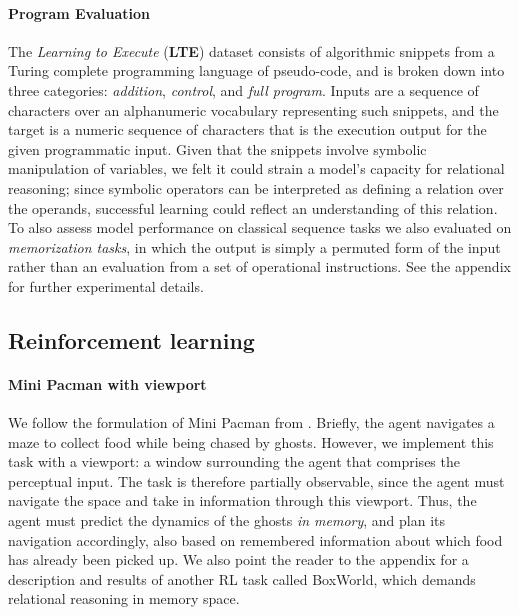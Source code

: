\documentclass{article}
\begin{document}
\paragraph{Program Evaluation}
The \textit{Learning to Execute} (\textbf{LTE}) dataset \cite{zaremba2014lte} consists of algorithmic snippets from a Turing complete programming language of pseudo-code, and is broken down into three categories: \textit{addition}, \textit{control}, and \textit{full program}. Inputs are a sequence of characters over an alphanumeric vocabulary representing such snippets, and the target is a numeric sequence of characters that is the execution output for the given programmatic input. Given that the snippets involve symbolic manipulation of variables, we felt it could strain a model's capacity for relational reasoning; since symbolic operators can be interpreted as defining a relation over the operands, successful learning could reflect an understanding of this relation. To also assess model performance on classical sequence tasks we also evaluated on \textit{memorization tasks}, in which the output is simply a permuted form of the input rather than an evaluation from a set of operational instructions.  See the appendix for further experimental details.

\subsection{Reinforcement learning}

\paragraph{Mini Pacman with viewport} We follow the formulation of Mini Pacman from \cite{weber2017imagination}. Briefly, the agent navigates a maze to collect food while being chased by ghosts. However, we implement this task with a viewport: a  window surrounding the agent that comprises the perceptual input. The task is therefore partially observable, since the agent must navigate the space and take in information through this viewport. Thus, the agent must predict the dynamics of the ghosts \textit{in memory}, and plan its navigation accordingly, also based on remembered information about which food has already been picked up. We also point the reader to the appendix for a description and results of another RL task called BoxWorld, which demands relational reasoning in memory space.
\end{document}
